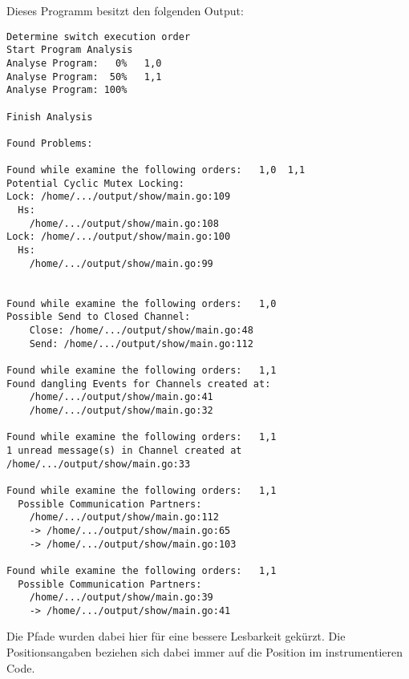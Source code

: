 Dieses Programm besitzt den folgenden Output:
\begin{verbatim}
Determine switch execution order
Start Program Analysis
Analyse Program:   0%   1,0
Analyse Program:  50%   1,1
Analyse Program: 100%

Finish Analysis

Found Problems:

Found while examine the following orders:   1,0  1,1
Potential Cyclic Mutex Locking:
Lock: /home/.../output/show/main.go:109
  Hs:
    /home/.../output/show/main.go:108
Lock: /home/.../output/show/main.go:100
  Hs:
    /home/.../output/show/main.go:99


Found while examine the following orders:   1,0
Possible Send to Closed Channel:
    Close: /home/.../output/show/main.go:48
    Send: /home/.../output/show/main.go:112

Found while examine the following orders:   1,1
Found dangling Events for Channels created at:  
    /home/.../output/show/main.go:41
    /home/.../output/show/main.go:32

Found while examine the following orders:   1,1
1 unread message(s) in Channel created at /home/.../output/show/main.go:33

Found while examine the following orders:   1,1
  Possible Communication Partners:
    /home/.../output/show/main.go:112
    -> /home/.../output/show/main.go:65
    -> /home/.../output/show/main.go:103

Found while examine the following orders:   1,1
  Possible Communication Partners:
    /home/.../output/show/main.go:39
    -> /home/.../output/show/main.go:41
\end{verbatim}
Die Pfade wurden dabei hier für eine bessere Lesbarkeit gekürzt.
Die Positionsangaben beziehen sich dabei immer auf die Position im 
instrumentieren Code.   
